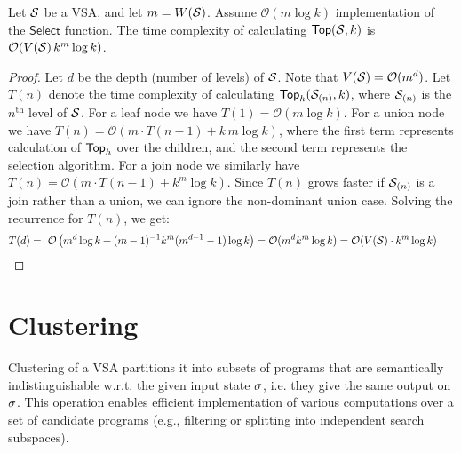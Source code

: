 \begin{theorem}
    \label{thm:vsa:ranking}
    Let $\mathcal{S}$ be a VSA, and let $m = W(\mathcal{S})$.
    Assume $\mathcal{O}(m \log k)$ implementation of the $\mathsf{Select}$ function.
    The time complexity of calculating $\mathsf{Top}(\mathcal{S}, k)$ is $\mathcal{O}(V(\mathcal{S})\, k^m \log k)$.
\end{theorem}
\begin{proof}
    Let $d$ be the depth (number of levels) of $\mathcal{S}$.
    Note that $V(\mathcal{S}) = \mathcal{O}(m^d)$.
    Let $T(n)$ denote the time complexity of calculating $\mathsf{Top}_{h}(\mathcal{S}_{(n)}, k)$, where $\mathcal{S}_{(n)}$ is the
    $n^{\text{th}}$ level of $\mathcal{S}$.
    For a leaf node we have $T(1) = \mathcal{O}(m \log k)$.
    For a union node we have $T(n) = \mathcal{O}(m \cdot T(n-1) + k\, m \log k)$, where the first term represents calculation of
    $\mathsf{Top}_{h}$ over the children, and the second term represents the selection algorithm.
    For a join node we similarly have $T(n) = \mathcal{O}(m\cdot T(n-1) + k^m \log k)$.
    Since $T(n)$ grows faster if $\mathcal{S}_{(n)}$ is a join rather than a union, we can ignore the non-dominant union case.
    Solving the recurrence for $T(n)$, we get:
    \addtolength{\jot}{-1pt}
    \begin{align*}
        T(d) &=\ \mathcal{O}\left( m^d \log k + (m-1)^{-1} k^m (m^{d-1}-1) \log k \right)
        = \mathcal{O}(m^d k^m \log k) = \mathcal{O}(V(\mathcal{S}) \cdot k^m \log k) \ \ \qedhere
    \end{align*}
\end{proof}

\section{Clustering}
Clustering of a VSA partitions it into subsets of programs that are semantically indistinguishable w.r.t. the given
input state $\sigma$, i.e. they give the same output on $\sigma$.
This operation enables efficient implementation of various computations over a set of candidate programs (e.g.,
filtering or splitting into independent search subspaces).

